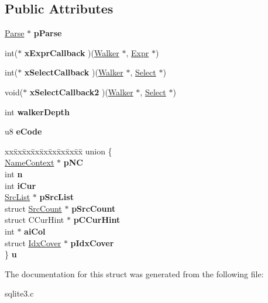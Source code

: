 \subsection*{Public Attributes}
\begin{DoxyCompactItemize}
\item 
\hyperlink{structParse}{Parse} $\ast$ {\bfseries p\+Parse}\hypertarget{structWalker_ac6e8e756b5da8f187b9cf6b94560f352}{}\label{structWalker_ac6e8e756b5da8f187b9cf6b94560f352}

\item 
int($\ast$ {\bfseries x\+Expr\+Callback} )(\hyperlink{structWalker}{Walker} $\ast$, \hyperlink{structExpr}{Expr} $\ast$)\hypertarget{structWalker_a46cbdf0ccdcf736096a2f168218d28fe}{}\label{structWalker_a46cbdf0ccdcf736096a2f168218d28fe}

\item 
int($\ast$ {\bfseries x\+Select\+Callback} )(\hyperlink{structWalker}{Walker} $\ast$, \hyperlink{structSelect}{Select} $\ast$)\hypertarget{structWalker_a76a2f8850bf1db17955fe85d65831cb0}{}\label{structWalker_a76a2f8850bf1db17955fe85d65831cb0}

\item 
void($\ast$ {\bfseries x\+Select\+Callback2} )(\hyperlink{structWalker}{Walker} $\ast$, \hyperlink{structSelect}{Select} $\ast$)\hypertarget{structWalker_ad35c57031847321ab3db9b7c0946b5e7}{}\label{structWalker_ad35c57031847321ab3db9b7c0946b5e7}

\item 
int {\bfseries walker\+Depth}\hypertarget{structWalker_a1183df46d2b0ecac73e76336067cf207}{}\label{structWalker_a1183df46d2b0ecac73e76336067cf207}

\item 
u8 {\bfseries e\+Code}\hypertarget{structWalker_a462e077f572efcae6a708f0640561807}{}\label{structWalker_a462e077f572efcae6a708f0640561807}

\item 
\begin{tabbing}
xx\=xx\=xx\=xx\=xx\=xx\=xx\=xx\=xx\=\kill
union \{\\
\>\hyperlink{structNameContext}{NameContext} $\ast$ {\bfseries pNC}\\
\>int {\bfseries n}\\
\>int {\bfseries iCur}\\
\>\hyperlink{structSrcList}{SrcList} $\ast$ {\bfseries pSrcList}\\
\>struct \hyperlink{structSrcCount}{SrcCount} $\ast$ {\bfseries pSrcCount}\\
\>struct CCurHint $\ast$ {\bfseries pCCurHint}\\
\>int $\ast$ {\bfseries aiCol}\\
\>struct \hyperlink{structIdxCover}{IdxCover} $\ast$ {\bfseries pIdxCover}\\
\} {\bfseries u}\hypertarget{structWalker_a89eaebf0880bf8e63a585043b92eeccf}{}\label{structWalker_a89eaebf0880bf8e63a585043b92eeccf}
\\

\end{tabbing}\end{DoxyCompactItemize}


The documentation for this struct was generated from the following file\+:\begin{DoxyCompactItemize}
\item 
sqlite3.\+c\end{DoxyCompactItemize}
